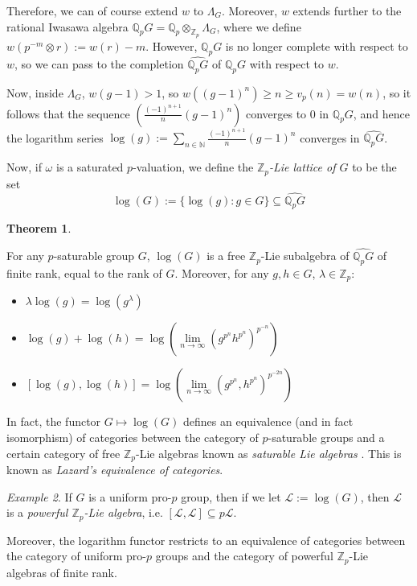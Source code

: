 \documentclass[12pt,a4paper]{article}
\makeatletter
\newcommand*{\rom}[1]{\expandafter\@slowromancap\romannumeral #1@}
\theoremstyle{definition}
\newtheorem{thm}{Theorem}[section]
\theoremstyle{remark}
\newtheorem{ex}[thm]{Example}
\theoremstyle{custthm}
\makeatother
\begin{document}
Therefore, we can of course extend $w$ to $\Lambda_G$. Moreover, $w$ extends further to the rational Iwasawa algebra $ \mathbb{Q}_pG=\mathbb{Q}_p\otimes_{\mathbb{Z}_p} \Lambda_G$, where we define $w(p^{-m}\otimes r):=w(r)-m$. However, $\mathbb{Q}_pG$ is no longer complete with respect to $w$, so we can pass to the completion $\widehat{\mathbb{Q}_pG}$ of $\mathbb{Q}_pG$ with respect to $w$.

Now, inside $\Lambda_G$, $w(g-1)>1$, so $w((g-1)^n)\geq n\geq v_p(n)=w(n)$, so it follows that the sequence $\left(\frac{(-1)^{n+1}}{n}(g-1)^n\right)$ converges to 0 in $\mathbb{Q}_pG$, and hence the logarithm series $\log(g):=\underset{n\in\mathbb{N}}{\sum}\frac{(-1)^{n+1}}{n}(g-1)^n$ converges in $\widehat{\mathbb{Q}_pG}$.

Now, if $\omega$ is a saturated $p$-valuation, we define the \emph{$\mathbb{Z}_p$-Lie lattice of $G$} to be the set $$\log(G):=\{\log(g):g\in G\}\subseteq\widehat{\mathbb{Q}_pG}$$

\begin{thm}\cite[\rom{4}.3.2.3]{Laz65} $ $

For any $p$-saturable group $G$, $\log(G)$ is a free $\mathbb{Z}_p$-Lie subalgebra of $\widehat{\mathbb{Q}_pG}$ of finite rank, equal to the rank of $G$. Moreover, for any $g,h\in G$, $\lambda\in\mathbb{Z}_p$: 
\begin{itemize}
\item $\lambda\log(g)=\log(g^\lambda)$

\item $\log(g)+\log(h)=\log\left(\underset{n\rightarrow\infty}{\lim}{\left(g^{p^n}h^{p^n}\right)^{p^{-n}}}\right)$

\item $[\log(g),\log(h)]=\log\left(\underset{n\rightarrow\infty}{\lim}{\left(g^{p^n},h^{p^n}\right)^{p^{-2n}}}\right)$
\end{itemize}
\end{thm}

In fact, the functor $G\mapsto\log(G)$ defines an equivalence (and in fact isomorphism) of categories between the category of $p$-saturable groups and a certain category of free $\mathbb{Z}_p$-Lie algebras known as \emph{saturable Lie algebras} \cite[\rom{4}.3.2.6]{Laz65}. This is known as \emph{Lazard's equivalence of categories}.

\begin{ex}
If $G$ is a uniform pro-$p$ group, then if we let $\mathcal{L}:=\log(G)$, then $\mathcal{L}$ is a \emph{powerful $\mathbb{Z}_p$-Lie algebra}, i.e. $[\mathcal{L},\mathcal{L}]\subseteq p\mathcal{L}$.

Moreover, the logarithm functor restricts to an equivalence of categories between the category of uniform pro-$p$ groups and the category of powerful $\mathbb{Z}_p$-Lie algebras of finite rank.
\end{ex}
\end{document}
